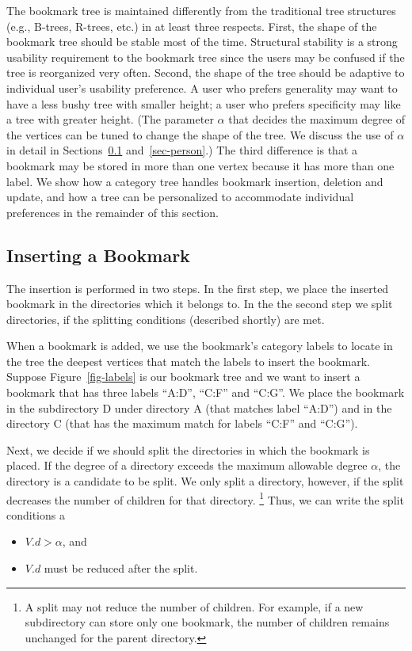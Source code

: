 The bookmark tree is maintained differently from the
traditional tree structures (e.g., B-trees, R-trees, etc.)
in at least three respects.
First, the shape of the bookmark tree should be stable most of the time.
Structural stability is a strong usability requirement to the bookmark
tree since the users may be confused if the tree is reorganized very often.
Second, the shape of the tree should be adaptive to individual
user's usability preference. A user who prefers generality 
may want to have a less bushy tree with smaller
height; a user who prefers specificity may like
a tree with greater height. (The parameter
$\alpha$ that decides the maximum degree of the vertices
can be tuned to change the shape of the tree. We
discuss the use of $\alpha$ in detail in Sections~\ref{sec-insert}
and~\ref{sec-person}.)
The third difference is that a bookmark may be stored in 
more than one vertex because it has more than one label.
We show how a category
tree handles bookmark insertion, deletion and
update, and how a tree can be personalized to accommodate individual 
preferences in the remainder of this section.

\subsection{Inserting a Bookmark}
\label{sec-insert}

The insertion is performed in two steps. In the
first step, we place the inserted bookmark in the
directories which it belongs to.  In the the second step
we split directories, if the splitting conditions (described shortly)
are met.

When a bookmark is added, we use the bookmark's 
category labels to locate in the tree the deepest vertices 
that match the labels to insert the bookmark.
Suppose Figure~\ref{fig-labels} is our bookmark tree
and we want to insert a bookmark that has three labels ``A:D'',
``C:F'' and ``C:G''. We place the bookmark in the 
subdirectory D under directory A (that matches
label ``A:D'') and in the directory C (that has the 
maximum match for labels ``C:F'' and ``C:G'').

Next, we decide if we should split the directories in which
the bookmark is placed. If the degree of a directory exceeds
the maximum allowable degree $\alpha$, 
the directory is a candidate to be split.
We only split a directory, however, if the split 
decreases the number of children for that directory.
\footnote{A split may not reduce the number of children.
For example, if a new subdirectory can store only one bookmark, the
number of children remains unchanged for the parent directory.}
Thus, we can write the split conditions a
\begin{itemize}
\item $V.d > \alpha$, and
\item $V.d$ must be reduced after the split.
\end{itemize}

